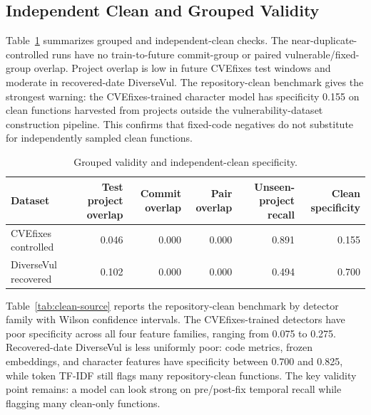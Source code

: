 \documentclass[a4paper,fleqn]{cas-dc}
\begin{document}
\subsection{Independent Clean and Grouped Validity}

Table~\ref{tab:clean} summarizes grouped and independent-clean checks. The
near-duplicate-controlled runs have no train-to-future commit-group or paired
vulnerable/fixed-group overlap. Project overlap is low in future CVEfixes test
windows and moderate in recovered-date DiverseVul. The repository-clean
benchmark gives the strongest warning: the CVEfixes-trained character model has
specificity 0.155 on clean functions harvested from projects outside the
vulnerability-dataset construction pipeline. This confirms that fixed-code
negatives do not substitute for independently sampled clean functions.

\begin{table}
\centering
\caption{Grouped validity and independent-clean specificity.}
\label{tab:clean}
\small
\setlength{\tabcolsep}{4pt}
\begin{tabular}{lrrrrr}
\toprule
Dataset & Test project overlap & Commit overlap & Pair overlap &
Unseen-project recall & Clean specificity \\
\midrule
CVEfixes controlled & 0.046 & 0.000 & 0.000 & 0.891 & 0.155 \\
DiverseVul recovered & 0.102 & 0.000 & 0.000 & 0.494 & 0.700 \\
\bottomrule
\end{tabular}
\end{table}

Table~\ref{tab:clean-source} reports the repository-clean benchmark by detector
family with Wilson confidence intervals. The CVEfixes-trained detectors have
poor specificity across all four feature families, ranging from 0.075 to 0.275.
Recovered-date DiverseVul is less uniformly poor: code metrics, frozen
embeddings, and character features have specificity between 0.700 and 0.825,
while token TF-IDF still flags many repository-clean functions. The key validity
point remains: a model can look
strong on pre/post-fix temporal recall while flagging many clean-only functions.
\end{document}
